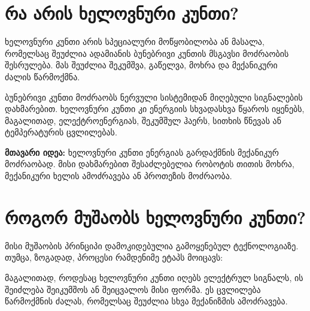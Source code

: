 \documentclass[12pt,a4paper]{article}
\begin{document}

\section{რა არის ხელოვნური კუნთი?}

ხელოვნური კუნთი არის სპეციალური მოწყობილობა ან მასალა, რომელსაც შეუძლია ადამიანის ბუნებრივი კუნთის მსგავსი მოძრაობის შესრულება. მას შეუძლია შეკუმშვა, გაწელვა, მოხრა და მექანიკური ძალის წარმოქმნა.

ბუნებრივი კუნთი მოძრაობს ნერვული სისტემიდან მიღებული სიგნალების დახმარებით. ხელოვნური კუნთი კი ენერგიის სხვადასხვა წყაროს იყენებს, მაგალითად, ელექტროენერგიას, შეკუმშულ ჰაერს, სითხის წნევას ან ტემპერატურის ცვლილებას.

\begin{infobox}
\textbf{მთავარი იდეა:} ხელოვნური კუნთი ენერგიას გარდაქმნის მექანიკურ მოძრაობად. მისი დახმარებით შესაძლებელია რობოტის თითის მოხრა, მექანიკური ხელის ამოძრავება ან პროთეზის მოძრაობა.
\end{infobox}

\section{როგორ მუშაობს ხელოვნური კუნთი?}

მისი მუშაობის პრინციპი დამოკიდებულია გამოყენებულ ტექნოლოგიაზე. თუმცა, ზოგადად, პროცესი რამდენიმე ეტაპს მოიცავს:

\begin{center}
\end{center}

მაგალითად, როდესაც ხელოვნური კუნთი იღებს ელექტრულ სიგნალს, ის შეიძლება შეიკუმშოს ან შეიცვალოს მისი ფორმა. ეს ცვლილება წარმოქმნის ძალას, რომელსაც შეუძლია სხვა მექანიზმის ამოძრავება.
\end{document}
